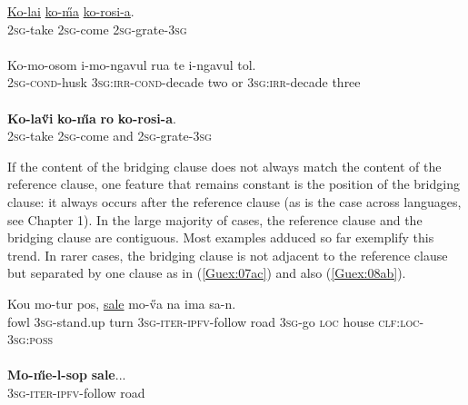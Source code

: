 \documentclass[output=paper]{LSP/langsci}
\begin{document}
\begin{exe}
\ex \label{Guex:07ac}
\begin{xlist}
\ex \label{Guex:07a}
\gll \underline{Ko-lai}   \underline{ko-\H{m}a}    \underline{ko-rosi-a}.\\
\textsc{2sg}-take   \textsc{2sg}-come   \textsc{2sg}-grate-\textsc{3sg}\\
\glt {}\\
\ex \label{Guex:07b}
\gll Ko-mo-osom  i-mo-ngavul               rua   te     i-ngavul    tol.\\
\textsc{2sg}-\textsc{cond}-husk  \textsc{3sg:irr-cond}-decade   two   or     \textsc{3sg:irr}-decade  three \\
\glt {}\\
\ex \label{Guex:07c}
\gll \textbf{Ko-la\H{v}i}  \textbf{ko-\H{m}a}  \textbf{ro}    \textbf{ko-rosi-a}.\\     	   
\textsc{2sg}-take   \textsc{2sg}-come  and \textsc{2sg}-grate-\textsc{3sg}\\
\glt {} 
\end{xlist}
\end{exe}



If the content of the bridging clause does not always match the content of the reference clause, one feature that remains constant is the position of the bridging clause: it always occurs after the reference clause (as is the case across languages, see Chapter 1). In the large majority of cases, the reference clause and the bridging clause are contiguous. Most examples adduced so far exemplify this trend. In rarer cases, the bridging clause is not adjacent to the reference clause but separated by one clause as in (\ref{Guex:07ac}) and also (\ref{Guex:08ab}).

\begin{exe}
\ex \label{Guex:08ab}
\begin{xlist}
\ex \label{Guex:08a}
\gll Kou    mo-tur           pos,      \underline{}                          \underline{sale} mo-\H{v}a       na  ima          sa-n.\\
fowl   \textsc{3sg}-stand.up    turn    \textsc{3sg}-\textsc{iter}-\textsc{ipfv}-follow   road       \textsc{3sg}-go  \textsc{loc}  house  \textsc{clf:loc-3sg:poss}\\
\glt {}\\
\ex \label{Guex:08b}
\gll \textbf{Mo-\H{m}e-l-sop}  \textbf{sale}...\\     	       
\textsc{3sg}-\textsc{iter}-\textsc{ipfv}-follow   road\\
\glt {} 
\end{xlist}
\end{exe}
\end{document}
